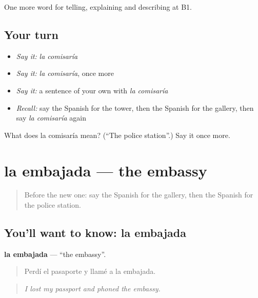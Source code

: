 \begin{grammarlens}[title={What you've built}]
One more word for telling, explaining and describing at B1.
\end{grammarlens}

\subsection*{Your turn}
\begin{itemize}
\raggedright
  \item \emph{Say it:} \emph{la comisaría}
  \item \emph{Say it:} \emph{la comisaría}, once more
  \item \emph{Say it:} a sentence of your own with \emph{la comisaría}
  \item \emph{Recall:} say the Spanish for the tower, then the Spanish for the gallery, then say \emph{la comisaría} again
\end{itemize}

\begin{tcolorbox}[breakable,colback=teal!4,colframe=teal!35!black,title={Before you move on}]
What does la comisaría mean? (\textquotedblleft{}The police station\textquotedblright{}.) Say it once more.
\end{tcolorbox}
\section[la embajada]{la embajada — the embassy}

\label{lesson:ES-C679-embajada}



\begin{quote}
Before the new one: say the Spanish for the gallery, then the Spanish for the police station.
\end{quote}

\subsection*{You'll want to know: la embajada}
\textbf{la embajada} — \textquotedblleft{}the embassy\textquotedblright{}.

\begin{quote}
Perdí el pasaporte y llamé a la embajada.
\end{quote}

\begin{quote}
\emph{I lost my passport and phoned the embassy.}
\end{quote}

